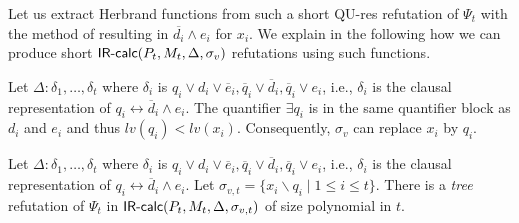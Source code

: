 \documentclass{llncs}
\newcommand{\qures}{\mbox{\sf QU-res}}
\newcommand{\IRcalcPMDSubst}[4]{$\mbox{\sf IR-calc}(#1,#2,#3,#4)$}
\newcommand{\is}{\ensuremath{\backslash}}
\newcommand{\lequiv}{\leftrightarrow}
\newcommand{\hkb}{\ensuremath{\Psi}}
\newcommand{\hkbt}[1]{\ensuremath{\hkb_{#1}}}
\newcommand{\level}[1]{{\mathit lv(#1)}}
\begin{document}
Let us extract Herbrand functions from such a short \qures{}
refutation of \hkbt{t} with the method of
\cite{DBLP:journals/fmsd/BalabanovJ12} resulting in $\overline{d_i}
\land e_i$ for $x_i$. We explain in the following how we can produce
short \IRcalcPMDSubst{P_t}{M_t}{\Delta}{\sigma_v}{} refutations using
such 
functions.

Let $\Delta \colon \delta_1,\ldots , \delta_t$ where $\delta_i$ is
$q_i \lor d_i \lor \overline{e}_i, \overline{q}_i \lor \overline{d}_i,
\overline{q}_i \lor e_i$, i.e., $\delta_i$ is the clausal
representation of $q_i \lequiv \overline{d}_i\land e_i$. The
quantifier  $\exists q_i$ is in the same quantifier block as
$d_i$ and $e_i$ and 
thus $\level{q_i}<\level{x_i}$. Consequently, $\sigma_v$
can replace $x_i$ by $q_i$.

\begin{proposition}\label{prop:short-proofs-HKB-in-IRcalcPMDeltaSubst}
Let $\Delta \colon \delta_1,\ldots , \delta_t$ where $\delta_i$ is
$q_i \lor d_i \lor \overline{e}_i, \overline{q}_i \lor \overline{d}_i,
\overline{q}_i \lor e_i$, i.e., $\delta_i$ is the clausal
representation of $q_i \lequiv \overline{d}_i\land e_i$. Let
$\sigma_{v,t}= \{x_i\is q_i \mid 1\leq i\leq t\}$.
There is a \emph{tree} refutation of \hkbt{t} in
\IRcalcPMDSubst{P_t}{M_t}{\Delta}{\sigma_{v,t}}{} of size 
polynomial in $t$.
\end{proposition}
\end{document}
